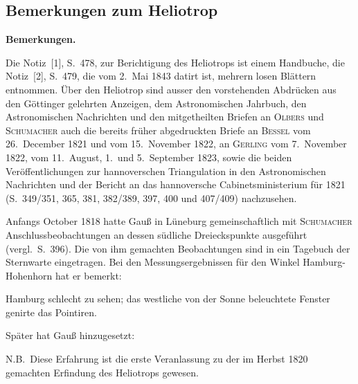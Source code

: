 \documentclass[12pt,a4paper]{article}
\theoremstyle{plain}
\theoremstyle{definition}
\theoremstyle{remark}
\begin{document}
\subsection*{Bemerkungen zum Heliotrop}

\noindent
\textbf{Bemerkungen.}

Die Notiz~[1], S.~478, zur Berichtigung des Heliotrops ist einem Handbuche, die Notiz~[2], S.~479, die vom 2.\ Mai 1843 datirt ist, mehrern losen Bl\"attern entnommen. \"Uber den Heliotrop sind ausser den vorstehenden Abdr\"ucken aus den G\"ottinger gelehrten Anzeigen, dem Astronomischen Jahrbuch, den Astronomischen Nachrichten und den mitgetheilten Briefen an \textsc{Olbers} und \textsc{Schumacher} auch die bereits fr\"uher abgedruckten Briefe an \textsc{Bessel} vom 26.\ December 1821 und vom 15.\ November 1822, an \textsc{Gerling} vom 7.\ November 1822, vom 11.\ August, 1.\ und 5.\ September 1823, sowie die beiden Ver\"offentlichungen zur hannoverschen Triangulation in den Astronomischen Nachrichten und der Bericht an das hannoversche Cabinetsministerium f\"ur 1821 (S.~349/351, 365, 381, 382/389, 397, 400 und 407/409) nachzusehen.

Anfangs October 1818 hatte Gau\ss{} in L\"uneburg gemeinschaftlich mit \textsc{Schumacher} Anschlussbeobachtungen an dessen s\"udliche Dreieckspunkte ausgef\"uhrt (vergl.\ S.~396). Die von ihm gemachten Beobachtungen sind in ein Tagebuch der Sternwarte eingetragen. Bei den Messungsergebnissen f\"ur den Winkel Hamburg-Hohenhorn hat er bemerkt:

\glqq Hamburg schlecht zu sehen; das westliche von der Sonne beleuchtete Fenster genirte das Pointiren.\grqq

Sp\"ater hat Gau\ss{} hinzugesetzt:

\glqq N.B.\ Diese Erfahrung ist die erste Veranlassung zu der im Herbst 1820 gemachten Erfindung des Heliotrops gewesen.\grqq
\end{document}
